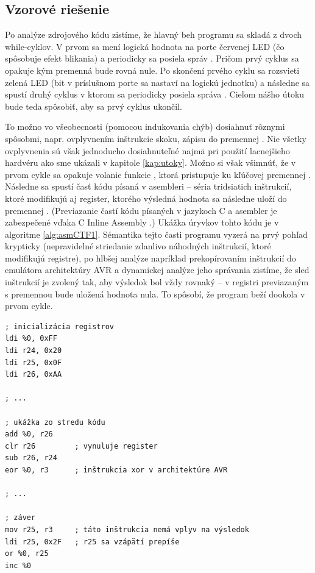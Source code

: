 \subsection{Vzorové riešenie}
Po analýze zdrojového kódu zistíme, že hlavný beh programu sa skladá z dvoch while-cyklov. V prvom sa mení logická hodnota na porte červenej LED (čo spôsobuje efekt blikania) a periodicky sa posiela správ . Pričom prvý cyklus sa opakuje kým premenná  bude rovná nule. Po skončení prvého cyklu sa rozsvieti zelená LED (bit v príslušnom porte sa nastaví na logickú jednotku) a následne sa spustí druhý cyklus v ktorom sa periodicky posiela správa . Cieľom nášho útoku bude teda spôsobiť, aby sa prvý cyklus ukončil.

To možno vo všeobecnosti (pomocou indukovania chýb) dosiahnuť rôznymi spôsobmi, napr. ovplyvnením inštrukcie skoku, zápisu do premennej . Nie všetky ovplyvnenia sú však jednoducho dosiahnuteľné najmä pri použití lacnejšieho hardvéru ako sme ukázali v kapitole \ref{kap:utoky}. Možno si však všimnúť, že v prvom cykle sa opakuje volanie funkcie , ktorá pristupuje ku kľúčovej premennej . Následne sa spustí časť kódu písaná v asembleri -- séria tridsiatich inštrukcií, ktoré modifikujú aj register, ktorého výsledná hodnota sa následne uloží do premennej . (Previazanie častí kódu písaných v jazykoch C a asembler je zabezpečené vďaka C Inline Assembly \cite{inlineAsm}.) Ukážka úryvkov tohto kódu je v algoritme \ref{alg:asmCTF1}. Sémantika tejto časti programu vyzerá na prvý pohľad krypticky (nepravidelné striedanie zdanlivo náhodných inštrukcií, ktoré modifikujú registre), po hlbšej analýze napríklad prekopírovaním inštrukcií do emulátora architektúry AVR a dynamickej analýze jeho správania zistíme, že sled inštrukcií je zvolený tak, aby výsledok bol vždy rovnaký -- v registri previazaným s premennou  bude uložená hodnota nula. To spôsobí, že program beží dookola v prvom cykle.

\begin{lstlisting}[float,language=AVR,caption={Ukážky kritickej časti kódu z príkladu 1. \%0 označuje výstupný parameter -- register s výstupnou hodnotou.},label=alg:asmCTF1]
; inicializácia registrov
ldi %0, 0xFF
ldi r24, 0x20
ldi r25, 0x0F
ldi r26, 0xAA

; ...

; ukážka zo stredu kódu
add %0, r26
clr r26         ; vynuluje register
sub r26, r24
eor %0, r3      ; inštrukcia xor v architektúre AVR

; ...

; záver
mov r25, r3     ; táto inštrukcia nemá vplyv na výsledok
ldi r25, 0x2F   ; r25 sa vzápätí prepíše
or %0, r25
inc %0
\end{lstlisting}

